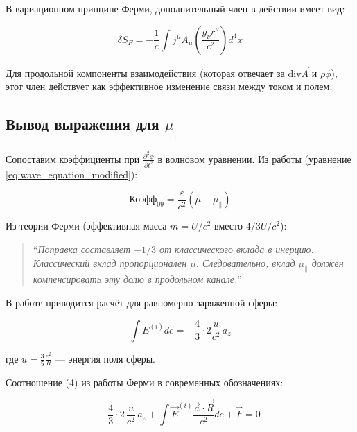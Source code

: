 \documentclass[12pt, a4paper]{article}
\begin{document}
В вариационном принципе Ферми, дополнительный член в действии имеет вид:

\begin{equation}
\delta S_F = -\frac{1}{c} \int j^\mu A_\mu \left( \frac{g_\nu r^\nu}{c^2} \right) d^4x
\label{eq:fermi_action_term}
\end{equation}

Для продольной компоненты взаимодействия (которая отвечает за $\text{div} \vec{A}$ и $\rho \phi$), этот член действует как эффективное изменение связи между током и полем.

\subsection{Вывод выражения для $\mu_{\parallel}$}

Сопоставим коэффициенты при $\frac{\partial^2 \phi}{\partial t^2}$ в волновом уравнении. Из работы \cite{NikolaevLorentz} (уравнение \ref{eq:wave_equation_modified}):

\begin{equation}
\text{Коэфф}_{09} = \frac{\varepsilon}{c^2} (\mu - \mu_{\parallel})
\label{eq:coefficient_09}
\end{equation}

Из теории Ферми (эффективная масса $m = U/c^2$ вместо $4/3 U/c^2$):

\begin{quote}
``\textit{Поправка составляет $-1/3$ от классического вклада в инерцию. Классический вклад пропорционален $\mu$. Следовательно, вклад $\mu_{\parallel}$ должен компенсировать эту долю в продольном канале.}''
\end{quote}

В работе \cite{FermiSolution} приводится расчёт для равномерно заряженной сферы:

\begin{equation}
\int E^{(i)} de = -\frac{4}{3} \cdot 2\frac{u}{c^2}\,a_z
\label{eq:fermi_sphere}
\end{equation}

где $u = \frac{3}{5}\frac{e^2}{R}$ --- энергия поля сферы.

Соотношение (4) из работы Ферми в современных обозначениях:

\begin{equation}
-\frac{4}{3}\cdot 2 \,\frac{u}{c^2} \, a_z + \int \vec{E}^{(i)}\frac{\vec{a} \cdot \vec{R}}{c^2} de + \vec{F} = 0
\label{eq:fermi_ratio}
\end{equation}
\end{document}
